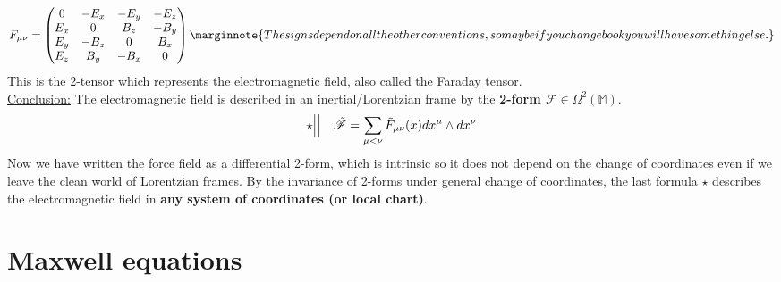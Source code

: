 \documentclass[../main.tex]{subfiles}
\begin{document}
\[
F_{\mu\nu}=\begin{pmatrix}
0 & -E_x & -E_y & -E_z \\
E_x & 0 & B_z & -B_y \\
E_y & -B_z & 0 & B_x \\
E_z & B_y & -B_x & 0
\end{pmatrix}\marginnote{The signs depend on all the other conventions, so maybe if you change book you will have something else.}
\]
This is the 2-tensor which represents the electromagnetic field, also called the \href{https://en.wikipedia.org/wiki/Michael_Faraday}{Faraday} tensor.\\
\underline{Conclusion:} The electromagnetic field is described in an inertial/Lorentzian frame by the \textbf{2-form $\mathcal{F}$}$\in\Omega^2(\mathbb{M})$.
\[
\star \Big| \Big| \quad \Tilde{\mathcal{F}}=\sum_{\mu<\nu}\Tilde{F}_{\mu\nu}(x)dx^{\mu}\wedge dx^{\nu}
\]
Now we have written the force field as a differential 2-form, which is intrinsic so it does not depend on the change of coordinates even if we leave the clean world of Lorentzian frames. By the invariance of 2-forms under general change of coordinates, the last formula $\star$ describes the electromagnetic field in \textbf{any system of coordinates (or local chart)}.

\section{Maxwell equations}
\end{document}
